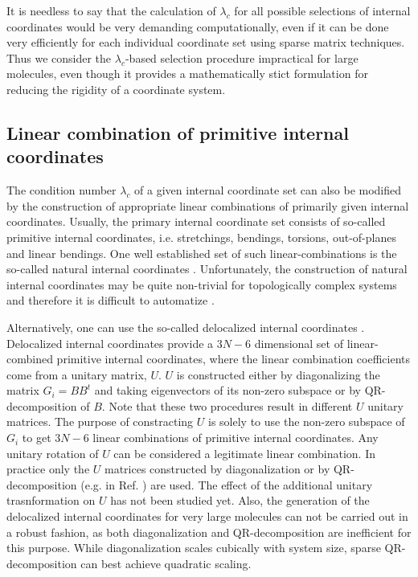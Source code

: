 \documentclass[prl,aps,preprint,superbib,12pt]{revtex4}
\begin{document}
It is needless to say that the calculation of $\lambda_{c}$
for all possible selections of internal coordinates would be 
very demanding computationally, even if it can be done very efficiently
for each individual coordinate set using sparse matrix techniques.
Thus we consider the $\lambda_{c}$-based
selection procedure impractical for large molecules, even though it
provides a mathematically stict formulation for reducing the rigidity
of a coordinate system.

\subsection{Linear combination of primitive internal coordinates}
The condition number $\lambda_{c}$ of a given internal coordinate set
can also be modified by the construction of appropriate linear 
combinations of primarily given internal coordinates. Usually, the
primary internal coordinate set consists of so-called primitive
internal coordinates, i.e. stretchings, bendings, torsions,
out-of-planes and linear bendings. One well established set of such
linear-combinations is the so-called natural internal coordinates
\cite{GFogarasi92,MvonArnim99}. Unfortunately, the construction
of natural internal coordinates may be quite non-trivial for
topologically complex systems and therefore it is difficult to 
automatize \cite{BPaizs00}. 

Alternatively, one can use the so-called delocalized
internal coordinates \cite{JBaker96}. Delocalized internal coordinates
provide a $3N-6$ dimensional set of linear-combined primitive
internal coordinates, where the linear combination coefficients
come from a unitary matrix, $U$. $U$ is constructed either by
diagonalizing the matrix $G_{i}=BB^{t}$ and taking eigenvectors of 
its non-zero subspace or by QR-decomposition of
$B$. Note that these two procedures result in different $U$ unitary 
matrices. The purpose of constracting $U$ is solely to use
the non-zero subspace of $G_{i}$ to get $3N-6$ linear combinations
of primitive internal coordinates. Any unitary rotation
of $U$ can be considered a legitimate linear combination. In practice 
only the $U$ matrices constructed by diagonalization 
\cite{JBaker96,JAndzelm92} or 
by QR-decomposition (e.g. in Ref. )
are used. The effect of the additional unitary trasnformation 
on $U$ has not been studied yet. Also, the generation of
the delocalized internal coordinates for very large molecules 
can not be carried out in a robust fashion,
as both diagonalization and QR-decomposition are
inefficient for this purpose. While diagonalization scales cubically
with system size, sparse QR-decomposition can best achieve 
quadratic scaling.
\end{document}
